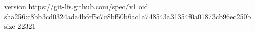 version https://git-lfs.github.com/spec/v1
oid sha256:c8bb3cd0324ada4bfcf5c7c8bf50b6ac1a748543a31354f0a01873cb96ec250b
size 22321
